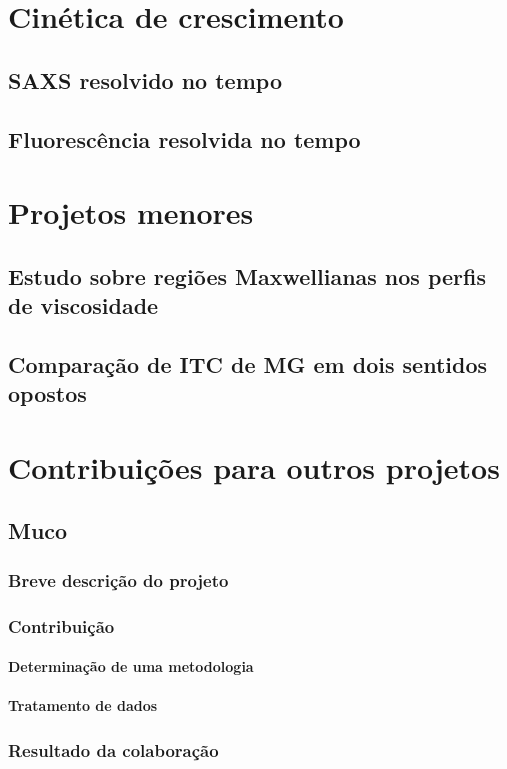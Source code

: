 \documentclass[a4paper, 10pt]{book}
\begin{document}
\part{Cinética de crescimento}
	\chapter{SAXS resolvido no tempo}
	\chapter{Fluorescência resolvida no tempo}
	
\part{Projetos menores}
	\chapter{Estudo sobre regiões Maxwellianas nos perfis de viscosidade}
	\chapter{Comparação de ITC de MG em dois sentidos opostos}
	
	
\part{Contribuições para outros projetos}
	\chapter{Muco}
		\section{Breve descrição do projeto}
		\section{Contribuição}
			\subsection{Determinação de uma metodologia}
			\subsection{Tratamento de dados}
		\section{Resultado da colaboração}
\end{document}
